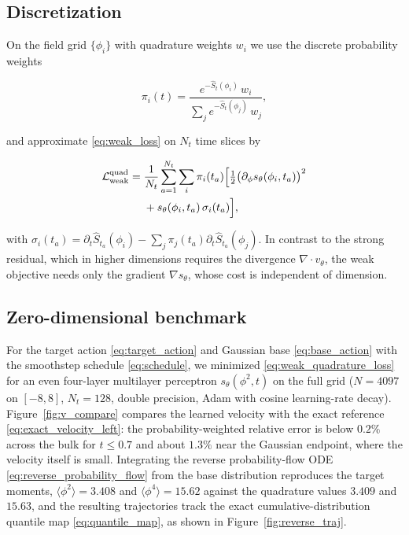 \documentclass[reprint,twocolumn,superscriptaddress,preprintnumbers,amsmath,amssymb,aps,prd,floatfix]{revtex4-2}
\begin{document}
\subsection{Discretization}

On the field grid $\{\phi_i\}$ with quadrature weights $w_i$ we use the discrete
probability weights

\begin{equation}
 \pi_i(t)=\frac{e^{-\hat S_t(\phi_i)}\,w_i}{\sum_j e^{-\hat S_t(\phi_j)}\,w_j},
 \label{eq:discrete_probability_weights}
\end{equation}

and approximate \eqref{eq:weak_loss} on $N_t$ time slices by

\begin{align}
 \mathcal{L}_{\mathrm{weak}}^{\mathrm{quad}}
 ={}&
 \frac{1}{N_t}\sum_{a=1}^{N_t}\sum_i \pi_i(t_a)
 \Bigl[
 \tfrac12\bigl(\partial_\phi s_\theta(\phi_i,t_a)\bigr)^2
 \nonumber\\
 &+
 s_\theta(\phi_i,t_a)\,\sigma_i(t_a)
 \Bigr],
 \label{eq:weak_quadrature_loss}
\end{align}

with
$\sigma_i(t_a)=\partial_t\hat S_{t_a}(\phi_i)-\sum_j\pi_j(t_a)\partial_t\hat S_{t_a}(\phi_j)$.
In contrast to the strong residual, which in higher dimensions requires the
divergence $\nabla\!\cdot v_\theta$, the weak objective needs only the gradient
$\nabla s_\theta$, whose cost is independent of dimension.

\subsection{Zero-dimensional benchmark}

For the target action \eqref{eq:target_action} and Gaussian base
\eqref{eq:base_action} with the smoothstep schedule \eqref{eq:schedule}, we
minimized \eqref{eq:weak_quadrature_loss} for an even four-layer multilayer
perceptron $s_\theta(\phi^2,t)$ on the full grid ($N=4097$ on $[-8,8]$, $N_t=128$,
double precision, Adam with cosine learning-rate decay).
Figure~\ref{fig:v_compare} compares the learned velocity
with the exact reference \eqref{eq:exact_velocity_left}: the probability-weighted
relative error is below $0.2\%$ across the bulk for $t\le0.7$ and about $1.3\%$
near the Gaussian endpoint, where the velocity itself is small. Integrating the
reverse probability-flow ODE \eqref{eq:reverse_probability_flow} from the base
distribution reproduces the target moments, $\langle\phi^2\rangle=3.408$ and
$\langle\phi^4\rangle=15.62$ against the quadrature values $3.409$ and $15.63$, and
the resulting trajectories track the exact cumulative-distribution quantile map
\eqref{eq:quantile_map}, as shown in Figure~\ref{fig:reverse_traj}.
\end{document}
